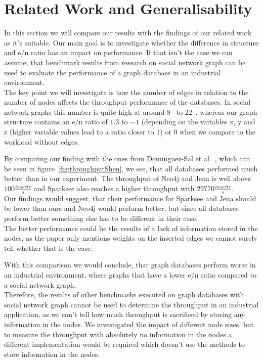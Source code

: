 \section{Related Work and Generalisability}
\label{ch:evaluation:se:relatedWorkAndGeneralisability}
In this section we will compare our results with the findings of our related work as it's suitable.
Our main goal is to investigate whether the difference in structure and e/n ratio has an impact on performance.
If that isn't the case we can assume,
that benchmark results from research on social network graph can be used to evaluate the performance of a graph database in an industrial environment.\\
The key point we will investigate is how the number of edges in relation to the number of nodes affects the throughput performance of the databases.
In social network graphs this number is quite high at around $ 8 $~\cite[41]{TaoShen} to $ 22 $~\cite{Dayarathna2012},
whereas our graph structure contains an e/n ratio of $ 1.3 $ to $ \sim1 $ (depending on the variables x, y and z (higher variable values lead to a ratio closer to 1) or $ 0 $ when we compare to the workload without edges.

By comparing our finding with the ones from Dominguez-Sal et al.~\cite{TaoShen},
which can be seen in figure~\ref{fig:throughputShen},
we see,
that all databases performed much better than in our experiment.
The throughput of Neo4j and Jena is well above $ 100 \frac{inserts}{s} $ and Sparksee also reaches a higher throughput with $ 29770 \frac{inserts}{s} $.\\
Our findings would suggest,
that their performance for Sparksee and Jena should be lower than ours and Neo4j would perform better,
but since all databases perform better something else has to be different in their case.\\
The better performance could be the results of a lack of information stored in the nodes,
as the paper only mentions weights on the inserted edges we cannot surely tell whether that is the case.

With this comparison we would conclude,
that graph databases perform worse in an industrial environment,
where graphs that have a lower e/n ratio compared to a social network graph.\\
Therefore,
the results of other benchmarks executed on graph databases with social network graph cannot be used to determine the throughput in an industrial application,
as we can't tell how much throughput is sacrificed by storing any information in the nodes.
We investigated the impact of different node sizes,
but to measure the throughput with absolutely no information in the nodes a different implementation would be required which doesn't use the methods to store information in the nodes.

